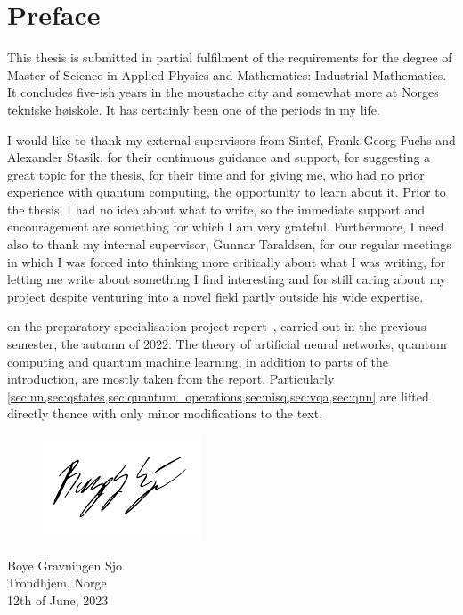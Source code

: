 \chapter{Preface}
This thesis is submitted in partial fulfilment of the requirements for the degree of Master of Science in Applied Physics and Mathematics: Industrial Mathematics.
It concludes five-ish years in the moustache city and somewhat more at Norges tekniske høiskole.
It has certainly been one of the periods in my life.

I would like to thank my external supervisors from Sintef, Frank Georg Fuchs and Alexander Stasik, for their continuous guidance and support, for suggesting a great topic for the thesis, for their time and for giving me, who had no prior experience with quantum computing, the opportunity to learn about it.
Prior to the thesis, I had no idea about what to write, so the immediate support and encouragement are something for which I am very grateful.
Furthermore, I need also to thank my internal supervisor, Gunnar Taraldsen, for our regular meetings in which I was forced into thinking more critically about what I was writing, for letting me write about something I find interesting and for still caring about my project despite venturing into a novel field partly outside his wide expertise.

\makebox[\dimexpr\textwidth-\parindent][s]{Do note that this master's thesis is based}
on the preparatory specialisation project report~\autocite{sjo2022}, carried out in the previous semester, the autumn of 2022.
The theory of artificial neural networks, quantum computing and quantum machine learning, in addition to parts of the introduction, are mostly taken from the report.
Particularly \cref{sec:nn,sec:qstates,sec:quantum_operations,sec:nisq,sec:vqa,sec:qnn} are lifted directly thence with only minor modifications to the text.

\vspace*{0.5cm}
\begin{figure}[h]
  \raggedleft
  \includegraphics[width=0.3\linewidth]{blank.pdf}
\end{figure}
\begin{flushright}
  \vspace{-1.3cm}
  Boye Gravningen Sjo \\
  Trondhjem, Norge \\
  12th of June, 2023
\end{flushright}

\cleardoublepage